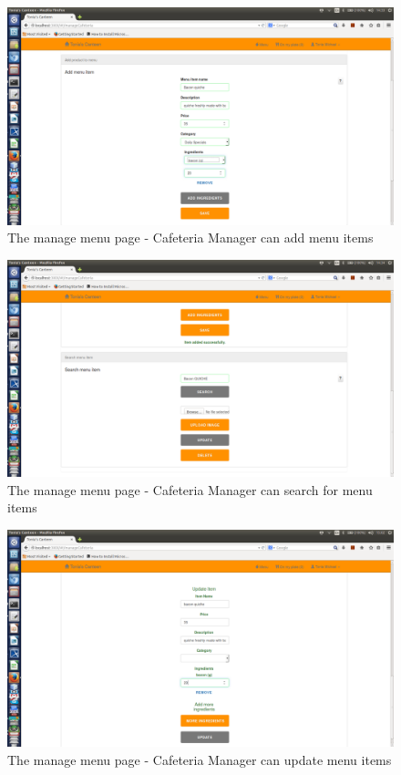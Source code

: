 \documentclass[a4paper,12pt]{report}
\begin{document}
\begin{figure}[H]
  \centering
    \includegraphics[width=1.0\textwidth]{screenshots/addMenu.png}
    \caption{The manage menu page - Cafeteria Manager can add menu items}
\end{figure}

\begin{figure}[H]
  \centering
    \includegraphics[width=1.0\textwidth]{screenshots/searchMenuItem.png}
    \caption{The manage menu page - Cafeteria Manager can search for menu items}
\end{figure}

\begin{figure}[H]
  \centering
    \includegraphics[width=1.0\textwidth]{screenshots/updateMenu.png}
    \caption{The manage menu page - Cafeteria Manager can update menu items}
\end{figure}
\end{document}
